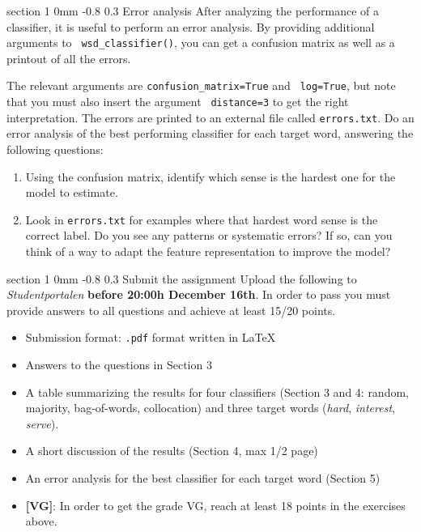 \documentclass[11pt]{article}
\makeatletter
\newcommand{\newsec}[2]{\section{#1}\label{sec:#2}\noindent}
\renewcommand{\section}{\@startsection
{section}%
{1}%
{0mm}%
{-0.8\baselineskip}%
{0.3\baselineskip}%
{\bfseries\large}}%
\makeatother
\begin{document}
\newsec{Error analysis }{submit}%
After analyzing the performance of a classifier, it is useful to
perform an error analysis. By providing additional arguments to {\tt
  wsd\_classifier()}, you can get a confusion matrix as well as a
printout of all the errors.
\begin{center}
\fbox{
\scalebox{0.55}{

}}
\end{center}
The relevant arguments are {\tt confusion\_matrix=True} and {\tt
  log=True}, but note that you must also insert the argument {\tt
  distance=3} to get the right interpretation. The errors are printed
to an external file called {\tt errors.txt}. Do an error analysis of
the best performing classifier for each target word, answering the
following questions:
\begin{enumerate}
\item  Using the confusion matrix, identify which sense is the hardest
  one for the model to estimate.
\item  Look in {\tt errors.txt} for examples where that hardest word
  sense is the correct label.  Do you see any patterns or systematic
  errors? If so, can you think of a way to adapt the feature
  representation to improve the model?
\end{enumerate}
\newsec{Submit the assignment}{submit}%
Upload the following to {\it Studentportalen} \textbf{before 20:00h
  December 16th}. In order to pass you must provide answers to all
questions and achieve at least 15/20 points.
\begin{itemize}[noitemsep,topsep=0.2cm]
\item Submission format: \texttt{.pdf} format written in \LaTeX
\item Answers to the questions in Section 3 
\item A table summarizing the results for four classifiers (Section 3
  and 4: random, majority, bag-of-words, collocation) and three target
  words (\emph{hard}, \emph{interest}, \emph{serve}).
\item A short discussion of the results (Section 4, max 1/2 page)
\item An error analysis for the best classifier for each target word (Section 5)
\item \textbf{[VG]}: In order to get the grade VG, reach at least 18
  points in the exercises above.
\end{itemize}
\end{document}
